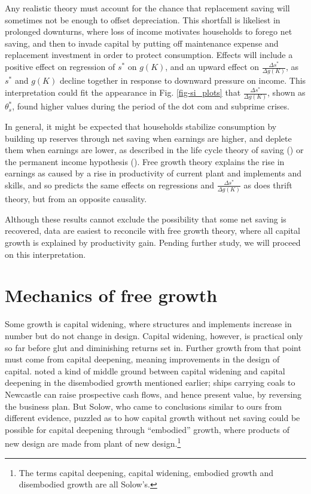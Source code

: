 \documentclass[a4paper,fleqn]{latex_styles/cas-sc}
\begin{document}
Any realistic theory must account for the chance that replacement saving will sometimes not be enough to offset depreciation. This shortfall is likeliest in prolonged downturns, where loss of income motivates households to forego net saving, and then to invade capital by putting off maintenance expense and replacement investment in order to protect consumption. Effects will include a positive effect on regression of \(s^*\) on \(g(K)\), and an upward effect on \(\frac{\Delta s^*}{\Delta g(K)}\), as \(s^*\) and \(g(K)\) decline together in response to downward pressure on income. This interpretation could fit the appearance in Fig. \ref{fig-si_plots} that \(\frac{\Delta s^*}{\Delta g(K)}\), shown as \(\theta^*_s\), found higher values during the period of the dot com and subprime crises.

In general, it might be expected that households stabilize consumption by building up reserves through net saving when earnings are higher, and deplete them when earnings are lower, as described in the life cycle theory of saving (\cite{modigliani1954utility}) or the permanent income hypothesis (\cite{friedman1957permanent}). Free growth theory explains the rise in earnings as caused by a rise in productivity of current plant and implements and skills, and so predicts the same effects on regressions and \(\frac{\Delta s^*}{\Delta g(K)}\) as does thrift theory, but from an opposite causality.

Although these results cannot exclude the possibility that some net saving is recovered, data are easiest to reconcile with free growth theory, where all capital growth is explained by productivity gain. Pending further study, we will proceed on this interpretation.

\hypertarget{mechanics-of-free-growth}{%
\section{Mechanics of free growth}\label{mechanics-of-free-growth}}

Some growth is capital widening, where structures and implements
increase in number but do not change in design. Capital widening,
however, is practical only so far before glut and diminishing returns
set in. Further growth from that point must come from capital deepening,
meaning improvements in the design of capital.
\citet{solowContributionTheoryEconomic1956a} noted a kind of middle
ground between capital widening and capital deepening in the disembodied
growth mentioned earlier; ships carrying coals to Newcastle can raise
prospective cash flows, and hence present value, by reversing the
business plan. But Solow, who came to conclusions similar to ours from
different evidence, puzzled as to how capital growth without net
saving could be possible for capital deepening through ``embodied''
growth, where products of new design are made from plant of new
design.\footnote{The terms capital deepening, capital widening, embodied
  growth and disembodied growth are all Solow's.}
\end{document}

